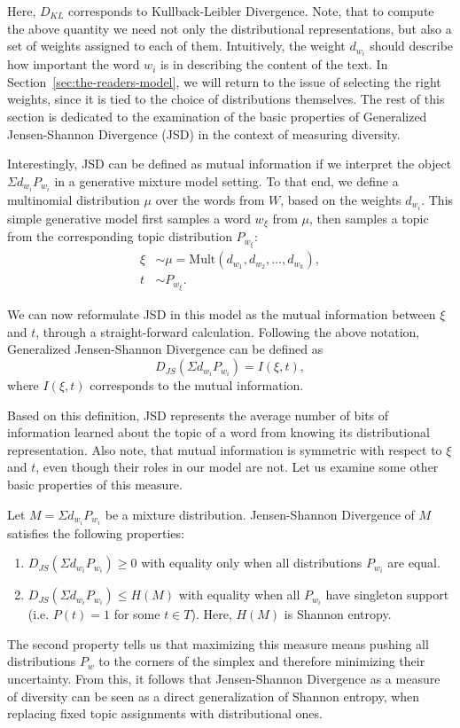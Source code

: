 Here, $D_{KL}$ corresponds to Kullback-Leibler Divergence.
Note, that to compute the above quantity we need not only the
distributional representations, but also a set of weights assigned to
each of them. Intuitively, the weight $d_{w_i}$ should describe how
important the word $w_i$ is in describing the content of the text. In
Section~\ref{sec:the-readers-model}, we will return to the issue of selecting the
right weights, since it is tied to the choice of distributions
themselves. The rest of this section is dedicated to the examination of the
basic properties of Generalized Jensen-Shannon Divergence (JSD) in the
context of measuring diversity. 

Interestingly, JSD can be defined as mutual information if we
interpret the object $\Sigma d_{w_i}P_{w_i}$ in a generative mixture
model setting. To that end, we define a multinomial distribution
$\mu$ over the words from $W$, based on the weights $d_{w_i}$. This
simple generative model first samples a word $w_\xi$ from $\mu$, then samples a
topic from the corresponding topic distribution $P_{w_\xi}$:
\begin{align*}
\xi &\sim \mu=\textrm{Mult}(d_{w_1},d_{w_2},\dots,d_{w_k}),\\
t &\sim P_{w_\xi}.
\end{align*}

We can now reformulate JSD in this model as the mutual information
between $\xi$ and $t$, through a straight-forward calculation.
\bep
Following the above notation, Generalized Jensen-Shannon Divergence
can be defined as
\[D_{JS}(\Sigma d_{w_i}P_{w_i})= I(\xi,t),\]
where $I(\xi,t)$ corresponds to the mutual information.
\eep

Based on this definition, JSD represents the average number of bits of
information learned about the topic of a word from knowing its
distributional representation. Also note, that mutual information is
symmetric with respect to $\xi$ and $t$, even though their roles in
our model are not. Let us examine some other basic properties of this
measure. 

\bep\label{jsd-properties}
Let $M=\Sigma d_{w_i} P_{w_i}$ be a mixture distribution. Jensen-Shannon
Divergence of $M$ satisfies the following properties:
 \begin{enumerate}
   \item $D_{JS}(\Sigma d_{w_i}P_{w_i})\geq 0$ with equality only when all
     distributions $P_{w_i}$ are equal.
   \item $D_{JS}(\Sigma d_{w_i}P_{w_i})\leq H(M)$ with equality when all
     $P_{w_i}$ have singleton support (i.e. $P(t)=1$ for some $t\in
     T$). Here, $H(M)$ is Shannon entropy.
 \end{enumerate}
\eep
The second property tells us that maximizing this measure means
pushing all distributions $P_w$ to the corners of the simplex and
therefore minimizing their uncertainty. From this, it follows that
Jensen-Shannon Divergence as a measure of diversity can be seen as a
direct generalization of Shannon entropy, when replacing fixed topic
assignments with distributional ones.  
